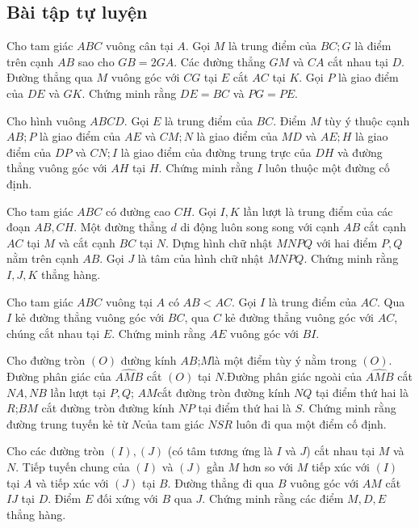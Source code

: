 \subsection{Bài tập tự luyện}                                                                                                      
\begin{bt}
Cho tam giác $ABC$ vuông cân tại $A$. Gọi $M$ là trung điểm của $BC; G$ là điểm trên cạnh $AB$ sao cho $GB=2GA$. Các đường thẳng $GM$ và $CA$ cắt nhau tại $D$. Đường thẳng qua $M$ vuông góc với $CG$ tại $E$ cắt $AC$ tại $ K$. Gọi $P$ là giao điểm của $DE$ và $GK$. Chứng minh rằng $DE = BC$ và $PG = PE$.
\end{bt}
\begin{bt}
	Cho hình vuông $ABCD$. Gọi $E$ là trung điểm của $BC$. Điểm $M$  tùy ý thuộc cạnh $AB; P$ là giao điểm của $AE$ và $CM; N $ là giao điểm của $MD$ và $AE; H$ là giao điểm của $DP$ và $CN; I$  là giao điểm của đường trung trực của $DH$ và đường thẳng vuông góc với $AH$  tại $H$. Chứng minh rằng  $I $ luôn thuộc một đường cố định.
\end{bt}
\begin{bt}
	Cho tam giác $ABC$ có đường cao $CH$. Gọi  $I, K$  lần lượt là trung điểm của các đoạn $AB, CH$. Một đường thẳng $d$ di động luôn song song với cạnh $AB$ cắt cạnh $AC$ tại $M$ và cắt cạnh $BC$ tại $N$. Dựng hình chữ nhật $MNPQ$ với hai điểm $P, Q$ nằm trên cạnh $AB$. Gọi  $J$  là tâm của hình chữ nhật $MNPQ$. Chứng minh rằng $I, J, K$ thẳng hàng.
\end{bt}
\begin{bt}
	Cho tam giác $ABC$ vuông tại $A$ có $AB<AC$. Gọi $I$ là trung điểm của $AC$. Qua $I$ kẻ đường thẳng vuông góc với $BC$, qua $C$ kẻ đường thẳng vuông góc với $AC$, chúng cắt nhau tại $E$. Chứng minh rằng $AE$ vuông góc với $BI$.
\end{bt}
\begin{bt}
	Cho đường tròn $(O)$ đường kính $AB$;$M$là một điểm tùy ý nằm trong $(O)$. Đường phân giác của $\widehat{AMB}$ cắt $(O)$ tại $N$.Đường phân giác ngoài của $\widehat{AMB}$ cắt $NA, NB$ lần lượt tại $P,Q$; $AM$cắt đường tròn đường kính $NQ$ tại điểm thứ hai là $R$;$BM$ cắt đường tròn đường kính $NP$ tại điểm thứ hai là $S$. Chứng minh rằng đường trung tuyến kẻ từ $N$của tam giác $NSR$ luôn đi qua một điểm cố định.
\end{bt}

\begin{bt}
Cho các đường tròn $(I),(J)$ (có tâm tương ứng là $I$ và $J$) cắt nhau tại $M$ và $N$. Tiếp tuyến chung của $(I)$ và $(J)$ gần $M$ hơn so với $M$ tiếp xúc với  $(I)$ tại $A$ và tiếp xúc với $(J)$ tại $B$. Đường thẳng đi qua $B$ vuông góc với $AM$ cắt $IJ$ tại $D$. Điểm $E$ đối xứng với $B$ qua $J$. Chứng minh rằng các điểm $M,D,E$ thẳng hàng.      
\end{bt}


